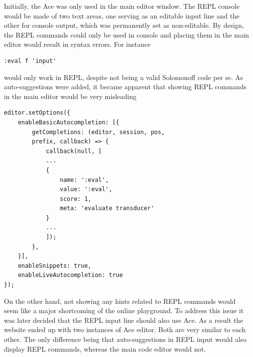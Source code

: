 Initially, the Ace  was only used in the main editor window. The REPL console would be made of two text areas, one serving as an editable input line and the other for console output, which was permanently set as non-editable. By design, the REPL commands could only be used in console and placing them in the main editor would result in syntax errors. For instance
\begin{lstlisting}
:eval f 'input'
\end{lstlisting}
would only work in REPL, despite not being a valid Solomonoff code per se. As auto-suggestions were added, it became apparent that showing  REPL commands in the main editor would be very misleading
\begin{lstlisting}
editor.setOptions({
    enableBasicAutocompletion: [{
        getCompletions: (editor, session, pos,
        prefix, callback) => {
            callback(null, [
            ... 
            {
                name: ':eval',
                value: ':eval',
                score: 1,
                meta: 'evaluate transducer'
            }
            ...
            ]);
        },
    }],
    enableSnippets: true,
    enableLiveAutocompletion: true
});
\end{lstlisting}
On the other hand, not showing any hints related to REPL commands would seem like a major shortcoming of the online playground. To address this issue it was later decided that the REPL input line should also use Ace. As a result the website ended up with two instances of Ace editor. Both are very similar to each other. The only difference being that auto-suggestions in REPL input would also display REPL commands, whereas the main code editor would not.

